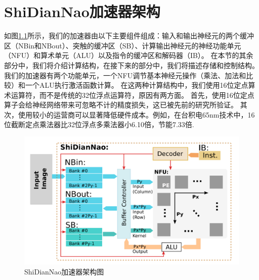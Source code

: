 
\chapter{ShiDianNao加速器架构}

如图\ref{fig:shidiannao_acc_arch}所示，我们的加速器由以下主要组件组成：输入和输出神经元的两个缓冲区（NBin和NBout）、突触的缓冲区（SB）、计算输出神经元的神经功能单元（NFU）和算术单元（ALU）以及指令的缓冲区和解码器（IB）。
在本节的其余部分中，我们将介绍计算结构，在接下来的部分中，我们将描述存储和控制结构。
我们的加速器有两个功能单元，一个NFU调节基本神经元操作（乘法、加法和比较）和一个ALU执行激活函数计算。
在这两种计算结构中，我们使用16位定点算术运算符，而不是传统的32位浮点运算符，原因有两方面。
首先，使用16位定点算子会给神经网络带来可忽略不计的精度损失，这已被先前的研究所验证。
其次，使用较小的运营商可以显著降低硬件成本。例如，在台积电65nm技术中，16位截断定点乘法器比32位浮点多乘法器小6.10倍，节能7.33倍.

\begin{figure}[htbp]
  \centering
  \includegraphics[width=12cm]{figures/shidiannao_acc_arch.png}
  \caption{ShiDianNao加速器架构图}
  \label{fig:shidiannao_acc_arch}
\end{figure} 

